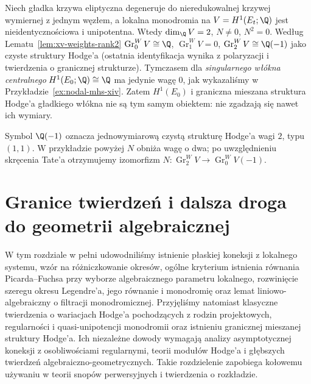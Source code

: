 \begin{przyklad}
\label{ex:xv-central-limit}
Niech gładka krzywa eliptyczna degeneruje do
nieredukowalnej krzywej wymiernej z jednym węzłem,
a lokalna monodromia na $V=H^1(E_t;\Q)$ jest
nieidentycznościowa i unipotentna.
Wtedy $\dim_\Q V=2$, $N\ne0$, $N^2=0$.
Według Lematu~\ref{lem:xv-weights-rank2}
$\operatorname{Gr}_0^WV\cong\Q$,
$\operatorname{Gr}_1^WV=0$,
$\operatorname{Gr}_2^WV\cong\Q(-1)$ jako czyste
struktury Hodge'a (ostatnia identyfikacja wynika z
polaryzacji i twierdzenia o granicznej strukturze).
Tymczasem dla \emph{singularnego włókna centralnego}
$H^1(E_0;\Q)\cong\Q$ ma jedynie wagę $0$,
jak wykazaliśmy w Przykładzie~\ref{ex:nodal-mhs-xiv}.
Zatem $H^1(E_0)$ i graniczna mieszana struktura
Hodge'a gładkiego włókna nie są tym samym obiektem:
nie zgadzają się nawet ich wymiary.
\end{przyklad}
\begin{uwaga}
Symbol $\Q(-1)$ oznacza jednowymiarową czystą
strukturę Hodge'a wagi $2$, typu $(1,1)$.
W przykładzie powyżej $N$ obniża wagę o dwa;
po uwzględnieniu skręcenia Tate'a otrzymujemy
izomorfizm $N:\operatorname{Gr}_2^WV\to
\operatorname{Gr}_0^WV(-1)$.
\end{uwaga}

\section{Granice twierdzeń i dalsza droga do geometrii algebraicznej}
W tym rozdziale w pełni udowodniliśmy istnienie płaskiej
koneksji z lokalnego systemu, wzór na różniczkowanie okresów,
ogólne kryterium istnienia równania Picarda--Fuchsa
przy wyborze algebraicznego parametru lokalnego,
rozwinięcie szeregu okresu Legendre'a, jego równanie i
monodromię oraz lemat liniowo-algebraiczny o filtracji
monodromicznej. Przyjęliśmy natomiast klasyczne twierdzenia
o wariacjach Hodge'a pochodzących z rodzin projektowych,
regularności i quasi-unipotencji monodromii oraz istnieniu
granicznej mieszanej struktury Hodge'a.
Ich niezależne dowody wymagają analizy asymptotycznej
koneksji z osobliwościami regularnymi, teorii modułów
Hodge'a i głębszych twierdzeń algebraiczno-geometrycznych.
Takie rozdzielenie zapobiega kołowemu używaniu
w teorii snopów perwersyjnych i twierdzenia
o rozkładzie.

